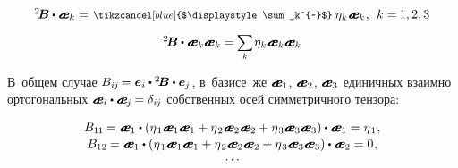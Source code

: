 \begin{otherlanguage}{russian}
\nopagebreak\vspace{-0.25em}\begin{equation*}\begin{array}{c}
{^2\!\bm{B}} \dotp \mathboldae_k = \hspace{.2ex} \scalebox{0.82}{$\tikzcancel[blue]{$\displaystyle\sum_k^{~}$}$}\: \eigenvalue_{\hspace{-0.15ex}k} \hspace{.1ex} \mathboldae_k \hspace{.1ex}, \:\: k =\hspace{-0.1ex} 1, 2, 3
\\[.9em]
%
{^2\!\bm{B}} \dotp \tikzmark{BeginEqualsEBrace} {\mathboldae_k \mathboldae_k} \tikzmark{EndEqualsEBrace} = \hspace{-0.1ex} \scalebox{0.9}{$\displaystyle \sum_{\smash{k}}$} \hspace{.2ex} \eigenvalue_{\hspace{-0.15ex}k} \hspace{.1ex} \mathboldae_k \mathboldae_k
\end{array}\end{equation*}

\vspace{-0.25em} В~общем случае ${B_{i\hspace{-0.1ex}j} \hspace{-0.2ex} = \bm{e}_i \dotp {^2\!\bm{B}} \dotp \bm{e}_{\hspace{-0.1ex}j}}$, в~базисе~же ${\mathboldae_1}$, ${\mathboldae_2}$, ${\mathboldae_3}$ единичных взаимно ортогональных ${\mathboldae_i \dotp \mathboldae_{\hspace{-0.1ex}j} \hspace{-0.15ex} = \delta_{i\hspace{-0.1ex}j}}$ собственных осей симметричного тензора:

\nopagebreak\vspace{-0.2em}\begin{equation*}\begin{array}{c}
B_{1\hspace{-0.1ex}1} \hspace{-0.12ex} = \mathboldae_1 \dotp \left({\eigenvalue_1 \mathboldae_1 \mathboldae_1 + \eigenvalue_2 \mathboldae_2 \mathboldae_2 + \eigenvalue_3 \mathboldae_3 \mathboldae_3}\right) \dotp \mathboldae_1 = \eigenvalue_1
\hspace{.1ex} ,
\\[.1em]
B_{12} \hspace{-0.12ex} = \mathboldae_1 \dotp \left({\eigenvalue_1 \mathboldae_1 \mathboldae_1 + \eigenvalue_2 \mathboldae_2 \mathboldae_2 + \eigenvalue_3 \mathboldae_3 \mathboldae_3}\right) \dotp \mathboldae_2 = 0
\hspace{.1ex} ,
\\[-0.2em]
\ldots
\end{array}\end{equation*}


\end{otherlanguage}
